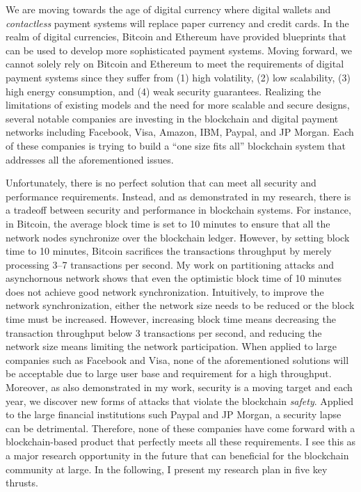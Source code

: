 \documentclass{NSF}
\begin{document}
We are moving towards the age of digital currency where digital wallets and {\em contactless} payment systems will replace paper currency and credit cards. In the realm of digital currencies, Bitcoin and Ethereum have provided blueprints that can be used to develop more sophisticated payment systems. Moving forward, we cannot solely rely on Bitcoin and Ethereum to meet the requirements of digital payment systems since they suffer from (1) high volatility, (2) low scalability, (3) high energy consumption, and (4) weak security guarantees. Realizing the limitations of existing models and the need for more scalable and secure designs, several notable companies are  investing in the blockchain and digital payment networks including Facebook, Visa, Amazon, IBM, Paypal, and JP Morgan. Each of these companies is trying to build a ``one size fits all'' blockchain system that addresses all the aforementioned issues. 

Unfortunately, there is no perfect solution that can meet all security and performance requirements. Instead, and as demonstrated in my research, there is a tradeoff between security and performance in blockchain systems. For instance, in Bitcoin, the average block time is set to 10 minutes to ensure that all the network nodes synchronize over the blockchain ledger. However, by setting block time to 10 minutes, Bitcoin sacrifices the transactions throughput by merely processing 3--7 transactions per second. My work on partitioning attacks and asynchornous network shows that even the optimistic block time of 10 minutes does not achieve good network synchronization. Intuitively, to improve the network synchronization, either the network size needs to be reduced or the block time must be increased. However, increasing block time means decreasing the transaction throughput below 3 transactions per second, and reducing the network size means limiting the network participation. When applied to large companies such as Facebook and Visa, none of the aforementioned solutions will be acceptable due to large user base and requirement for a high throughput. Moreover, as also demonstrated in my work, security is a moving target and each year, we discover new forms of attacks that violate the blockchain {\em safety}. Applied to the large financial institutions such Paypal and JP Morgan, a security lapse can be detrimental. Therefore, none of these companies have come forward with a blockchain-based product that perfectly meets all these requirements. I see this as a major research opportunity in the future that can beneficial for the blockchain community at large. In the following, I present my research plan in five key thrusts.
\end{document}
